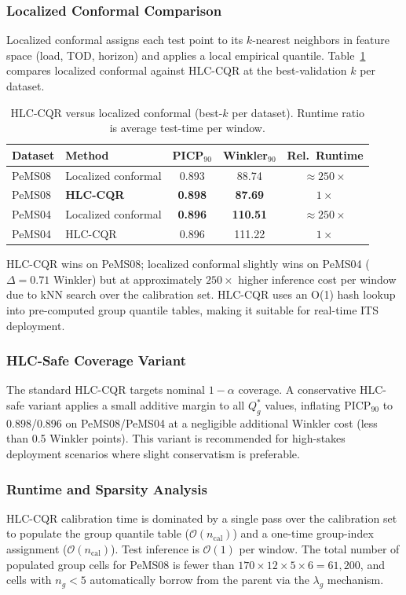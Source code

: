 \documentclass[letterpaper,journal]{IEEEtran}
\begin{document}
\subsubsection{Localized Conformal Comparison}
Localized conformal assigns each test point to its $k$-nearest neighbors
in feature space (load, TOD, horizon) and applies a local empirical quantile.
Table~\ref{tab:localized} compares localized conformal against HLC-CQR at
the best-validation $k$ per dataset.

\begin{table}[t]
\centering
\caption{HLC-CQR versus localized conformal (best-$k$ per dataset).
Runtime ratio is average test-time per window.}
\label{tab:localized}
\footnotesize
\begin{tabular}{llccc}
\toprule
Dataset & Method & PICP$_{90}$ & Winkler$_{90}$ & Rel.\ Runtime \\
\midrule
PeMS08 & Localized conformal & 0.893 & 88.74 & ${\approx}250\times$ \\
PeMS08 & \textbf{HLC-CQR}    & \textbf{0.898} & \textbf{87.69} & $1\times$ \\
\midrule
PeMS04 & Localized conformal & \textbf{0.896} & \textbf{110.51} & ${\approx}250\times$ \\
PeMS04 & HLC-CQR             & 0.896 & 111.22 & $1\times$ \\
\bottomrule
\end{tabular}
\end{table}

HLC-CQR wins on PeMS08; localized conformal slightly wins on PeMS04
($\Delta=0.71$ Winkler) but at approximately $250\times$ higher inference
cost per window due to kNN search over the calibration set.  HLC-CQR uses
an O(1) hash lookup into pre-computed group quantile tables, making it
suitable for real-time ITS deployment.

\subsubsection{HLC-Safe Coverage Variant}
The standard HLC-CQR targets nominal $1-\alpha$ coverage.  A conservative
HLC-safe variant applies a small additive margin to all $Q^{*}_g$ values,
inflating PICP$_{90}$ to $0.898$/$0.896$ on PeMS08/PeMS04 at a negligible
additional Winkler cost (less than 0.5 Winkler points).  This variant is
recommended for high-stakes deployment scenarios where slight
conservatism is preferable.

\subsubsection{Runtime and Sparsity Analysis}
HLC-CQR calibration time is dominated by a single pass over the
calibration set to populate the group quantile table
($\mathcal{O}(n_\text{cal})$) and a one-time group-index assignment
($\mathcal{O}(n_\text{cal})$).  Test inference is $\mathcal{O}(1)$ per
window.  The total number of populated group cells for PeMS08 is fewer than
$170 \times 12 \times 5 \times 6 = 61{,}200$, and cells with $n_g < 5$
automatically borrow from the parent via the $\lambda_g$ mechanism.
\end{document}
